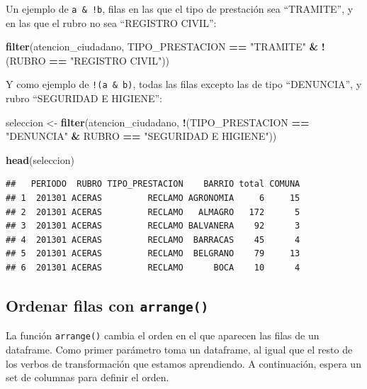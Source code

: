 \documentclass[]{book}
\newenvironment{Shaded}{\begin{snugshade}}{\end{snugshade}}
\newcommand{\KeywordTok}[1]{\textcolor[rgb]{0.13,0.29,0.53}{\textbf{#1}}}
\newcommand{\StringTok}[1]{\textcolor[rgb]{0.31,0.60,0.02}{#1}}
\newcommand{\OperatorTok}[1]{\textcolor[rgb]{0.81,0.36,0.00}{\textbf{#1}}}
\newcommand{\NormalTok}[1]{#1}
\begin{document}
Un ejemplo de \texttt{a\ \&\ !b}, filas en las que el tipo de prestación
sea ``TRAMITE'', y en las que el rubro no sea ``REGISTRO CIVIL'':

\begin{Shaded}
\begin{Highlighting}[]
\KeywordTok{filter}\NormalTok{(atencion_ciudadano, TIPO_PRESTACION }\OperatorTok{==}\StringTok{ "TRAMITE"} \OperatorTok{&}\StringTok{ }\OperatorTok{!}\NormalTok{(RUBRO }\OperatorTok{==}\StringTok{ "REGISTRO CIVIL"}\NormalTok{))}
\end{Highlighting}
\end{Shaded}

Y como ejemplo de \texttt{!(a\ \&\ b)}, todas las filas excepto las de
tipo ``DENUNCIA'', y rubro ``SEGURIDAD E HIGIENE'':

\begin{Shaded}
\begin{Highlighting}[]
\NormalTok{seleccion <-}\StringTok{ }\KeywordTok{filter}\NormalTok{(atencion_ciudadano, }\OperatorTok{!}\NormalTok{(TIPO_PRESTACION }\OperatorTok{==}\StringTok{ "DENUNCIA"} \OperatorTok{&}\StringTok{ }\NormalTok{RUBRO }\OperatorTok{==}\StringTok{ "SEGURIDAD E HIGIENE"}\NormalTok{))}

\KeywordTok{head}\NormalTok{(seleccion)}
\end{Highlighting}
\end{Shaded}

\begin{verbatim}
##   PERIODO  RUBRO TIPO_PRESTACION    BARRIO total COMUNA
## 1  201301 ACERAS         RECLAMO AGRONOMIA     6     15
## 2  201301 ACERAS         RECLAMO   ALMAGRO   172      5
## 3  201301 ACERAS         RECLAMO BALVANERA    92      3
## 4  201301 ACERAS         RECLAMO  BARRACAS    45      4
## 5  201301 ACERAS         RECLAMO  BELGRANO    79     13
## 6  201301 ACERAS         RECLAMO      BOCA    10      4
\end{verbatim}

\subsection{\texorpdfstring{Ordenar filas con
\texttt{arrange()}}{Ordenar filas con arrange()}}\label{ordenar-filas-con-arrange}

La función \texttt{arrange()} cambia el orden en el que aparecen las
filas de un dataframe. Como primer parámetro toma un dataframe, al igual
que el resto de los verbos de transformación que estamos aprendiendo. A
continuación, espera un set de columnas para definir el orden.
\end{document}
